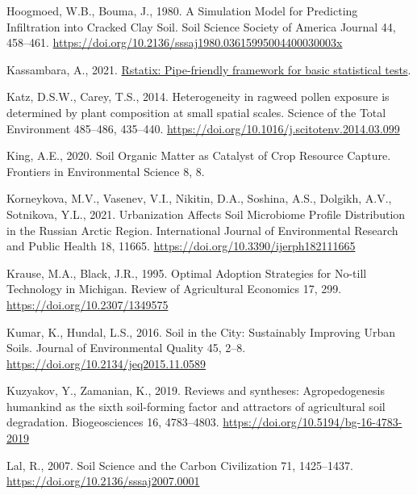 \documentclass[
  12pt,
]{article}
\newlength{\cslhangindent}
\newlength{\cslentryspacingunit} %
\newenvironment{CSLReferences}[2] %
 {%
  \setlength{\parindent}{0pt}
  \ifodd #1
  \let\oldpar\par
  \def\par{\hangindent=\cslhangindent\oldpar}
  \fi
  \setlength{\parskip}{#2\cslentryspacingunit}
 }%
 {}
\begin{document}
\begin{CSLReferences}{1}{0}
\leavevmode{}%
Hoogmoed, W.B., Bouma, J., 1980. A {Simulation Model} for {Predicting Infiltration} into {Cracked Clay Soil}. Soil Science Society of America Journal 44, 458--461. \url{https://doi.org/10.2136/sssaj1980.03615995004400030003x}

\leavevmode{}%
Kassambara, A., 2021. \href{https://CRAN.R-project.org/package=rstatix}{Rstatix: Pipe-friendly framework for basic statistical tests}.

\leavevmode{}%
Katz, D.S.W., Carey, T.S., 2014. Heterogeneity in ragweed pollen exposure is determined by plant composition at small spatial scales. Science of the Total Environment 485--486, 435--440. \url{https://doi.org/10.1016/j.scitotenv.2014.03.099}

\leavevmode{}%
King, A.E., 2020. Soil {Organic Matter} as {Catalyst} of {Crop Resource Capture}. Frontiers in Environmental Science 8, 8.

\leavevmode{}%
Korneykova, M.V., Vasenev, V.I., Nikitin, D.A., Soshina, A.S., Dolgikh, A.V., Sotnikova, Y.L., 2021. Urbanization {Affects Soil Microbiome Profile Distribution} in the {Russian Arctic Region}. International Journal of Environmental Research and Public Health 18, 11665. \url{https://doi.org/10.3390/ijerph182111665}

\leavevmode{}%
Krause, M.A., Black, J.R., 1995. Optimal {Adoption Strategies} for {No-till Technology} in {Michigan}. Review of Agricultural Economics 17, 299. \url{https://doi.org/10.2307/1349575}

\leavevmode{}%
Kumar, K., Hundal, L.S., 2016. Soil in the {City}: {Sustainably Improving Urban Soils}. Journal of Environmental Quality 45, 2--8. \url{https://doi.org/10.2134/jeq2015.11.0589}

\leavevmode{}%
Kuzyakov, Y., Zamanian, K., 2019. Reviews and syntheses: {Agropedogenesis} \textendash{} humankind as the sixth soil-forming factor and attractors of agricultural soil degradation. Biogeosciences 16, 4783--4803. \url{https://doi.org/10.5194/bg-16-4783-2019}

\leavevmode{}%
Lal, R., 2007. Soil {Science} and the {Carbon Civilization} 71, 1425--1437. \url{https://doi.org/10.2136/sssaj2007.0001}


\end{CSLReferences}
\end{document}
